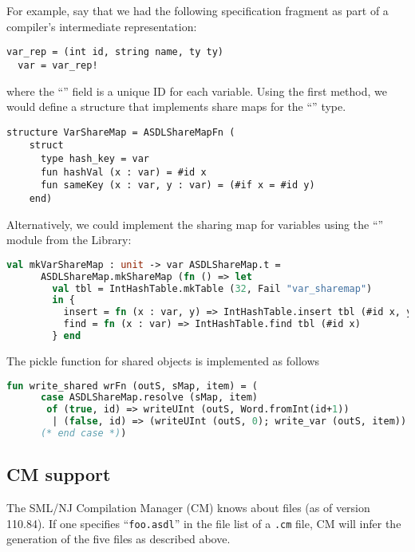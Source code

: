 For example, say that we had the following \asdl{} specification fragment
as part of a compiler's intermediate representation:
\begin{code}
\begin{lstlisting}[language=asdl]
  var_rep = (int id, string name, ty ty)
  var = var_rep!
\end{lstlisting}%
\end{code}%
where the ``'' field is a unique ID for each variable.
Using the first method, we would define a structure that implements
share maps for the ``'' type.
\begin{code}
\begin{lstlisting}[language=asdl]
structure VarShareMap = ASDLShareMapFn (
    struct
      type hash_key = var
      fun hashVal (x : var) = #id x
      fun sameKey (x : var, y : var) = (#if x = #id y)
    end)
\end{lstlisting}%
\end{code}%
Alternatively, we could implement the sharing map for variables using the
``'' module from the \smlnj{} Library:
\begin{code}
\begin{lstlisting}[language=sml]
val mkVarShareMap : unit -> var ASDLShareMap.t =
      ASDLShareMap.mkShareMap (fn () => let
        val tbl = IntHashTable.mkTable (32, Fail "var_sharemap")
        in {
          insert = fn (x : var, y) => IntHashTable.insert tbl (#id x, y),
          find = fn (x : var) => IntHashTable.find tbl (#id x)
        } end
\end{lstlisting}%
\end{code}%
%
The pickle function for shared objects is implemented as follows
\begin{code}
\begin{lstlisting}[language=sml]
fun write_shared wrFn (outS, sMap, item) = (
      case ASDLShareMap.resolve (sMap, item)
       of (true, id) => writeUInt (outS, Word.fromInt(id+1))
        | (false, id) => (writeUInt (outS, 0); write_var (outS, item))
      (* end case *))
\end{lstlisting}%
\end{code}%

\subsection{CM support}
The SML/NJ Compilation Manager (CM) knows about \asdl{} files (as of version 110.84).
If one specifies ``\texttt{foo.asdl}'' in the file list of a \texttt{.cm} file, CM will
infer the generation of the five \sml{} files as described above.

